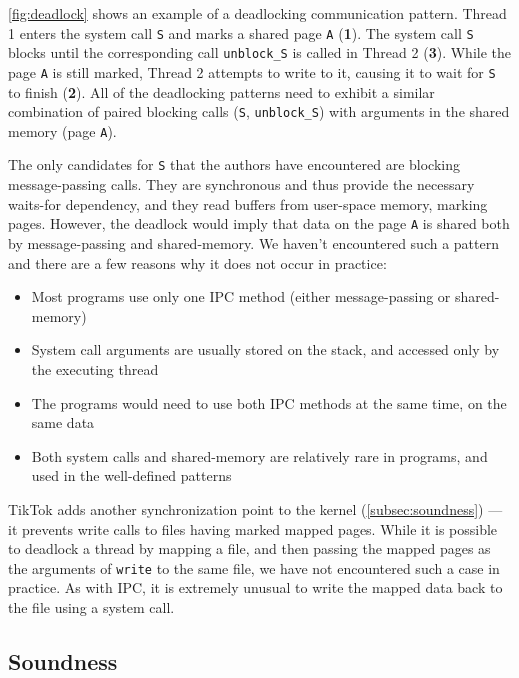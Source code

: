 \documentclass[conference]{IEEEtran}
\newcommand{\sysname}{TikTok}
\begin{document}
\autoref{fig:deadlock} shows an example of a deadlocking communication pattern.
Thread 1 enters the system call \texttt{S} and marks a shared page \texttt{A}
(\textbf{1}). The system call \texttt{S} blocks until the corresponding call
\texttt{unblock\_S} is called in Thread 2 (\textbf{3}). While the page
\texttt{A} is still marked, Thread 2 attempts to write to it, causing it to wait
for \texttt{S} to finish (\textbf{2}). All of the deadlocking patterns need to
exhibit a similar combination of paired blocking calls (\texttt{S},
\texttt{unblock\_S}) with arguments in the shared memory (page \texttt{A}).

The only candidates for \texttt{S} that the authors have encountered are
blocking message-passing calls. They are synchronous and thus provide the
necessary waits-for dependency, and they read buffers from user-space memory,
marking pages. However, the deadlock would imply that data on the page
\texttt{A} is shared both by message-passing and shared-memory. We haven't
encountered such a pattern and there are a few reasons why it does not occur in
practice:

\begin{itemize}
  \item Most programs use only one IPC method (either message-passing or
  shared-memory)
  \item System call arguments are usually stored on the stack, and accessed only
  by the executing thread
  \item The programs would need to use both IPC methods at the same time, on the
  same data
  \item Both system calls and shared-memory are relatively rare in programs, and
  used in the well-defined patterns
\end{itemize}

\sysname{} adds another synchronization point to the kernel
(\autoref{subsec:soundness}) --- it prevents write calls to files having marked
mapped pages. While it is possible to deadlock a thread by mapping a file, and
then passing the mapped pages as the arguments of \texttt{write} to the same
file, we have not encountered such a case in practice. As with IPC, it is
extremely unusual to write the mapped data back to the file using a system call.

\subsection{Soundness}
\label{subsec:soundness}
\end{document}
